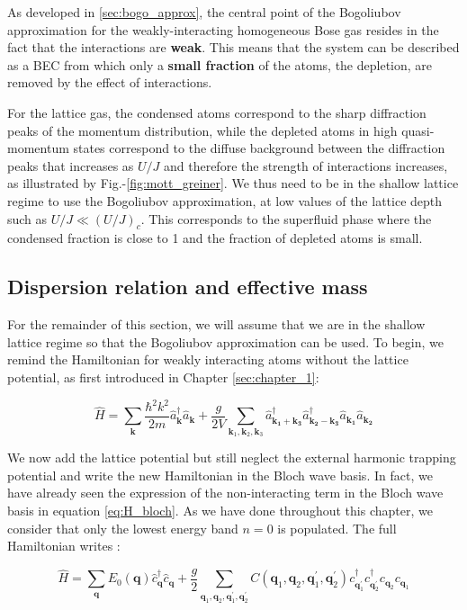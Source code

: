 As developed in \ref{sec:bogo_approx}, the central point of the Bogoliubov approximation for the weakly-interacting homogeneous Bose gas resides in the fact that the interactions are \textbf{weak}. This means that the system can be described as a BEC from which only a \textbf{small fraction} of the atoms, the depletion, are removed by the effect of interactions.

For the lattice gas, the condensed atoms correspond to the sharp diffraction peaks of the momentum distribution, while the depleted atoms in high quasi-momentum states correspond to the diffuse background between the diffraction peaks that increases as $U/J$ and therefore the strength of interactions increases, as illustrated by Fig.-\ref{fig:mott_greiner}. We thus need to be in the shallow lattice regime to use the Bogoliubov approximation, \ie at low values of the lattice depth such as $U/J \ll (U/J)_c$. This corresponds to the superfluid phase where the condensed fraction is close to 1 and the fraction of depleted atoms is small.


\subsection{Dispersion relation and effective mass}

For the remainder of this section, we will assume that we are in the shallow lattice regime so that the Bogoliubov approximation can be used. To begin, we remind the Hamiltonian for weakly interacting atoms without the lattice potential, as first introduced in Chapter \ref{sec:chapter_1}:

\begin{equation}
    \hat{H}=\sum_{\bm{k}}\frac{\hbar^2 k^2}{2m} \hat{a}^{\dagger}_{\bm{k}}  \hat{a}_{\bm{k}} +  \frac{g}{2V} \sum_{\bm{k}_1,\bm{k}_2,\bm{k}_3} \hat{a}^{\dagger}_{\bm{k_1}+\bm{k_3}} \hat{a}^{\dagger}_{\bm{k_2}-\bm{k_3}} \hat{a}_{\bm{k_1}} \hat{a}_{\bm{k_2}} 
\end{equation}

We now add the lattice potential but still neglect the external harmonic trapping potential and write the new Hamiltonian in the Bloch wave basis. In fact, we have already seen the expression of the non-interacting term in the Bloch wave basis in equation \ref{eq:H_bloch}. As we have done throughout this chapter, we consider that only the lowest energy band $n=0$ is populated. The full Hamiltonian writes \cite{dalibard2013cages}:

\begin{equation}
    \hat{H}=\sum_{\bm{q}} E_{0}(\bm{q}) \hat{c}_{\bm{q}}^{\dagger} \hat{c}_{\bm{q}}+\frac{g}{2} \sum_{\bm{q}_{1}, \bm{q}_{2}, \bm{q}_{1}^{\prime}, \bm{q}_{2}^{\prime}} C\left(\bm{q}_{1}, \bm{q}_{2}, \bm{q}_{1}^{\prime}, \bm{q}_{2}^{\prime}\right) c_{\bm{q}_{1}^{\prime}}^{\dagger} c_{\bm{q}_{2}^{\prime}}^{\dagger} c_{\bm{q}_{2}} c_{\bm{q}_{1}}
    \label{eq:lattice_bogo_hamiltonian}
\end{equation}


